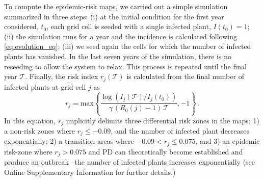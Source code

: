     To compute the epidemic-risk maps, we carried out a simple simulation
    summarized in three steps: (i) at the initial condition for the first year
    considered, $t_0$, each grid cell is seeded with a single infected plant,
$I(t_0)=1$; (ii) the simulation runs for a year and the incidence is calculated
    following \cref{eq:evolution_eq}; (iii) we seed again the cells for which
    the
    number of infected plants has vanished. In the last seven years of the
    simulation, there is no reseeding to allow the system to relax. This
    process is
    repeated until the final year $\mathcal{T}$. Finally, the risk index
$r_j(\mathcal{T})$ is calculated from the final number of infected plants at
    grid cell $j$ as
    \begin{equation}
        r_j=\textrm{max}\left\{\frac{\log(I_j(\mathcal{T})
            /I_j(t_0))}{\gamma\,
            (R_0(j)-1)\, \mathcal{T}}, -1 \right\} \ .
        \label{eq:riskmeasure}
    \end{equation}
    In this equation, $r_j$ implicitly delimits three differential risk zones
    in the maps: 1) a non-risk zones where $r_j \le -0.09$, and the number of
    infected plant decreases exponentially; 2) a transition areas where $-0.09
< r_j \le 0.075 $, and 3) an epidemic risk-zone where $ r_j >0.075$ and PD
    can
    theoretically become established and produce an outbreak --the number of
    infected plants increases exponentially (see Online Supplementary
    Information for
    further
    details.)

